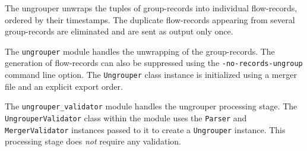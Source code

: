 The ungrouper unwraps the tuples of group-records into individual
flow-records, ordered by their  timestamps. The duplicate
flow-records appearing from several group-records are eliminated and are sent
as output only once.

The \texttt{ungrouper} module handles the unwrapping of the group-records. The
generation  of flow-records can also be
suppressed using the \texttt{-no-records-ungroup} command line option. The
\texttt{Ungrouper} class instance is initialized using a merger file and an
explicit export order.

The \texttt{ungrouper\_validator} module handles the ungrouper processing
stage.  The  \texttt{UngrouperValidator} class
within the module uses the \texttt{Parser} and \texttt{MergerValidator}
instances passed to it to create a \texttt{Ungrouper} instance. This
processing stage does \emph{not} require any validation.




